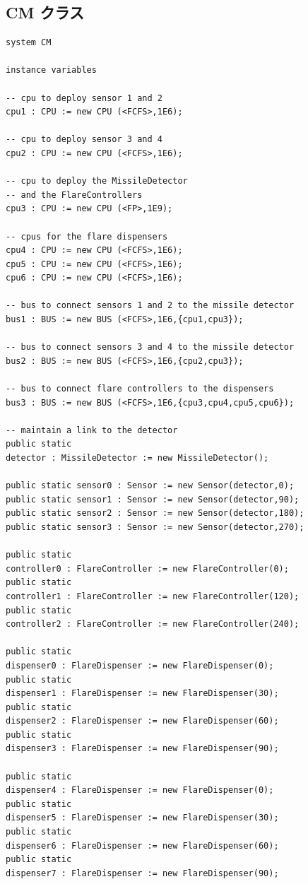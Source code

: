 \documentclass[\pformat,12pt]{jreport}
\begin{document}
\subsection{CM クラス}

\begin{lstlisting}
system CM

instance variables

-- cpu to deploy sensor 1 and 2
cpu1 : CPU := new CPU (<FCFS>,1E6);

-- cpu to deploy sensor 3 and 4
cpu2 : CPU := new CPU (<FCFS>,1E6);

-- cpu to deploy the MissileDetector
-- and the FlareControllers
cpu3 : CPU := new CPU (<FP>,1E9);

-- cpus for the flare dispensers
cpu4 : CPU := new CPU (<FCFS>,1E6);
cpu5 : CPU := new CPU (<FCFS>,1E6);
cpu6 : CPU := new CPU (<FCFS>,1E6);

-- bus to connect sensors 1 and 2 to the missile detector
bus1 : BUS := new BUS (<FCFS>,1E6,{cpu1,cpu3});

-- bus to connect sensors 3 and 4 to the missile detector
bus2 : BUS := new BUS (<FCFS>,1E6,{cpu2,cpu3});
  
-- bus to connect flare controllers to the dispensers
bus3 : BUS := new BUS (<FCFS>,1E6,{cpu3,cpu4,cpu5,cpu6});

-- maintain a link to the detector
public static 
detector : MissileDetector := new MissileDetector();

public static sensor0 : Sensor := new Sensor(detector,0);
public static sensor1 : Sensor := new Sensor(detector,90);
public static sensor2 : Sensor := new Sensor(detector,180);
public static sensor3 : Sensor := new Sensor(detector,270);

public static 
controller0 : FlareController := new FlareController(0);
public static 
controller1 : FlareController := new FlareController(120);
public static 
controller2 : FlareController := new FlareController(240);

public static 
dispenser0 : FlareDispenser := new FlareDispenser(0);
public static 
dispenser1 : FlareDispenser := new FlareDispenser(30);
public static 
dispenser2 : FlareDispenser := new FlareDispenser(60);
public static 
dispenser3 : FlareDispenser := new FlareDispenser(90);

public static 
dispenser4 : FlareDispenser := new FlareDispenser(0);
public static 
dispenser5 : FlareDispenser := new FlareDispenser(30);
public static 
dispenser6 : FlareDispenser := new FlareDispenser(60);
public static 
dispenser7 : FlareDispenser := new FlareDispenser(90);


\end{lstlisting}
\end{document}
